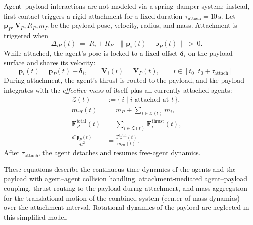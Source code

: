 Agent–payload interactions are not modeled via a spring–damper system; instead, first contact triggers a rigid attachment for a fixed duration \( \tau_{\text{attach}}=10\,\mathrm{s} \). Let \( \mathbf{p}_P, \mathbf{V}_P, R_P, m_P \) be the payload pose, velocity, radius, and mass. Attachment is triggered when
\begin{equation}
    \Delta_{iP}(t) \;=\; R_i + R_P - \|\mathbf{p}_i(t) - \mathbf{p}_P(t)\| \;>\; 0.
\end{equation}
While attached, the agent’s pose is locked to a fixed offset \( \boldsymbol{\delta}_i \) on the payload surface and shares its velocity:
\begin{equation}
    \mathbf{p}_i(t) = \mathbf{p}_P(t) + \boldsymbol{\delta}_i,\qquad
    \mathbf{V}_i(t) = \mathbf{V}_P(t), \qquad t\in[t_0,\, t_0+\tau_{\text{attach}}].
\end{equation}
During attachment, the agent’s thrust is routed to the payload, and the payload integrates with the \emph{effective mass} of itself plus all currently attached agents:
\begin{align}
    \mathcal{Z}(t) &:= \{\,i \;|\; i \text{ attached at } t \,\}, \\
    m_{\mathrm{eff}}(t) &= m_P + \sum_{i\in\mathcal{Z}(t)} m_i, \\
    \mathbf{F}_P^{\text{total}}(t) &= \sum_{i\in\mathcal{Z}(t)} \mathbf{F}_i^{\text{thrust}}(t), \\
    \frac{d^2 \mathbf{p}_P(t)}{dt^2} &= \frac{\mathbf{F}_P^{\text{total}}(t)}{m_{\mathrm{eff}}(t)}.
\end{align}
After \( \tau_{\text{attach}} \), the agent detaches and resumes free-agent dynamics.

These equations describe the continuous-time dynamics of the agents and the payload with agent–agent collision handling, attachment-mediated agent–payload coupling, thrust routing to the payload during attachment, and mass aggregation for the translational motion of the combined system (center-of-mass dynamics) over the attachment interval. Rotational dynamics of the payload are neglected in this simplified model.


